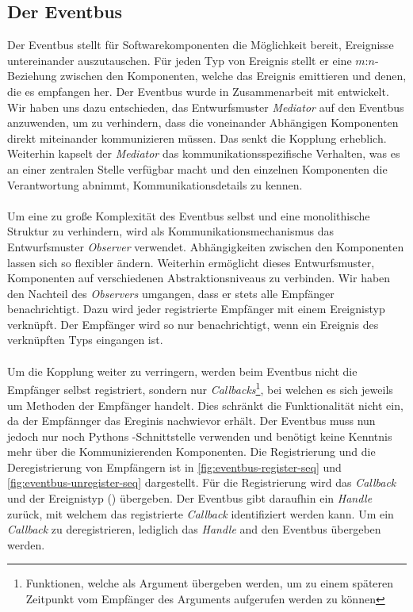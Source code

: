 \subsection{Der Eventbus}

Der Eventbus stellt für Softwarekomponenten die Möglichkeit bereit, Ereignisse untereinander auszutauschen. Für jeden Typ von Ereignis stellt er eine $m$:$n$-Beziehung zwischen den Komponenten, welche das Ereignis emittieren und denen, die es empfangen her. Der Eventbus wurde in Zusammenarbeit mit \citeauthor{persitzky_fehlerinjektion_2023} entwickelt. Wir haben uns dazu entschieden, das Entwurfsmuster \emph{Mediator} auf den Eventbus anzuwenden, um zu verhindern, dass die voneinander Abhängigen Komponenten direkt miteinander kommunizieren müssen. Das senkt die Kopplung erheblich. Weiterhin kapselt der \emph{Mediator} das kommunikationsspezifische Verhalten, was es an einer zentralen Stelle verfügbar macht und den einzelnen Komponenten die Verantwortung abnimmt, Kommunikationsdetails zu kennen.\\
\\
Um eine zu große Komplexität des Eventbus selbst und eine monolithische Struktur zu verhindern, wird als Kommunikationsmechanismus das Entwurfsmuster \emph{Observer} verwendet. Abhängigkeiten zwischen den Komponenten lassen sich so flexibler ändern. Weiterhin ermöglicht dieses Entwurfsmuster, Komponenten auf verschiedenen Abstraktionsniveaus zu verbinden. Wir haben den Nachteil des \emph{Observers} umgangen, dass er stets alle Empfänger benachrichtigt. Dazu wird jeder registrierte Empfänger mit einem Ereignistyp verknüpft. Der Empfänger wird so nur benachrichtigt, wenn ein Ereignis des verknüpften Typs eingangen ist.\\
\\
Um die Kopplung weiter zu verringern, werden beim Eventbus nicht die Empfänger selbst registriert, sondern nur \emph{Callbacks}\footnote{Funktionen, welche als Argument übergeben werden, um zu einem späteren Zeitpunkt vom Empfänger des Arguments aufgerufen werden zu können}, bei welchen es sich jeweils um Methoden der Empfänger handelt. Dies schränkt die Funktionalität nicht ein, da der Empfännger das Ereginis nachwievor erhält. Der Eventbus muss nun jedoch nur noch Pythons -Schnittstelle verwenden und benötigt keine Kenntnis mehr über die Kommunizierenden Komponenten. Die Registrierung und die Deregistrierung von Empfängern ist in \autoref{fig:eventbus-register-seq} und \autoref{fig:eventbus-unregister-seq} dargestellt. Für die Registrierung wird das \emph{Callback} und der Ereignistyp () übergeben. Der Eventbus gibt daraufhin ein \emph{Handle} zurück, mit welchem das registrierte \emph{Callback} identifiziert werden kann. Um ein \emph{Callback} zu deregistrieren, lediglich das \emph{Handle} and den Eventbus übergeben werden.

